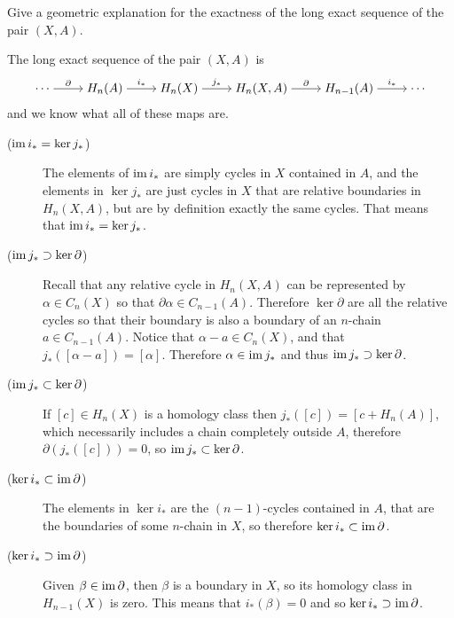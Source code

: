 \documentclass[11pt,a4paper]{article}
\begin{document}
\begin{exercise}
  Give a geometric explanation for the exactness of the long exact sequence
  of the pair $(X,A)$.
\end{exercise}
\begin{solution}
  The long exact sequence of the pair $(X,A)$ is
  \[\begin{tikzcd}[ampersand replacement=\&,cramped]
    \cdots \& {H_n(A)} \& {H_n(X)} \& {H_n(X,A)} \& {H_{n-1}(A)} \& \cdots
    \arrow["\partial", from=1-1, to=1-2]
    \arrow["{i_*}", from=1-2, to=1-3]
    \arrow["{j_*}", from=1-3, to=1-4]
    \arrow["\partial", from=1-4, to=1-5]
    \arrow["{i_*}", from=1-5, to=1-6]
  \end{tikzcd}\]
  and we know what all of these maps are.
  \begin{description}
    \item[($\operatorname{im} i_* = \ker j_*$)]
      The elements of $\operatorname{im} i_*$ are simply cycles in $X$ contained in $A$,
      and the elements in $\ker j_*$ are just cycles in $X$ that are relative
      boundaries in $H_n(X,A)$, but are by definition exactly the same cycles.
      That means that $\operatorname{im} i_* = \ker j_*$.
    \item[($\operatorname{im} j_* \supset \ker \partial$)] Recall that any relative cycle
      in $H_n(X,A)$ can be represented by $\alpha \in C_n(X)$ so that
      $\partial \alpha \in C_{n-1}(A)$.
      Therefore $\ker \partial$ are all the relative cycles so that their
      boundary is also a boundary of an $n$-chain $a \in C_{n-1}(A)$.
      Notice that $\alpha - a \in C_n(X)$,
      and that $j_*([\alpha - a]) = [\alpha]$.
      Therefore $\alpha \in \operatorname{im} j_*$ and thus $\operatorname{im} j_* \supset \ker \partial$.
    \item[($\operatorname{im} j_* \subset \ker \partial$)]
      If $[c] \in H_n(X)$ is a homology class then $j_*([c]) = [c + H_n(A)]$,
      which necessarily includes a chain completely outside $A$,
      therefore $\partial(j_*([c])) = 0$,
      so $\operatorname{im} j_* \subset \ker \partial$.
    \item[($\ker i_* \subset \operatorname{im} \partial$)]
      The elements in $\ker i_*$ are the $(n-1)$-cycles contained in $A$,
      that are the boundaries of some $n$-chain in $X$,
      so therefore $\ker i_* \subset \operatorname{im} \partial$.
    \item[($\ker i_* \supset \operatorname{im} \partial$)]
      Given $\beta \in \operatorname{im} \partial$, then $\beta$ is a boundary in $X$,
      so its homology class in $H_{n-1}(X)$ is zero.
      This means that $i_*(\beta) = 0$ and so $\ker i_* \supset \operatorname{im} \partial$.
  \end{description}
\end{solution}
\end{document}
